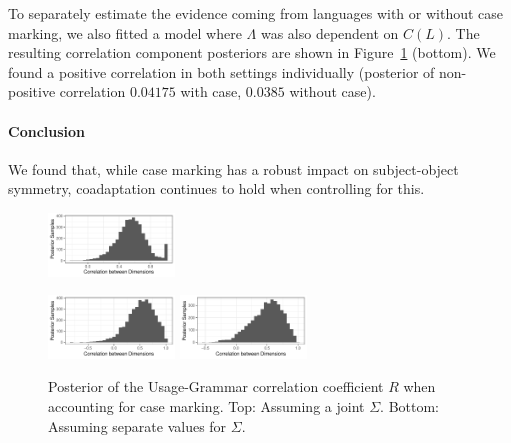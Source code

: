 \documentclass[11pt,a4paper]{article}
\begin{document}
To separately estimate the evidence coming from languages with or without case marking, we also fitted a model where $\Lambda$ was also dependent on $C(L)$.
The resulting correlation component posteriors are shown in Figure~\ref{fig:posterior-case} (bottom).
We found a positive correlation in both settings individually (posterior of non-positive correlation $0.04175$ with case, $0.0385$ without case).

\paragraph{Conclusion}
We found that, while case marking has a robust impact on subject-object symmetry, coadaptation continues to hold when controlling for this.

\begin{figure}
    \centering
    \includegraphics[width=0.3\textwidth]{../change/visualize/figures/corr_ornuhl-binom_42.pdf}
    
    \includegraphics[width=0.3\textwidth]{../change/visualize/figures/corr_ornuhl-binom_45_Case.pdf}
    \includegraphics[width=0.3\textwidth]{../change/visualize/figures/corr_ornuhl-binom_45_NoCase.pdf}
    \caption{Posterior of the Usage-Grammar correlation coefficient $R$ when accounting for case marking. Top: Assuming a joint $\Sigma$. Bottom: Assuming separate values for $\Sigma$.}
    \label{fig:posterior-case}
\end{figure}
\end{document}
